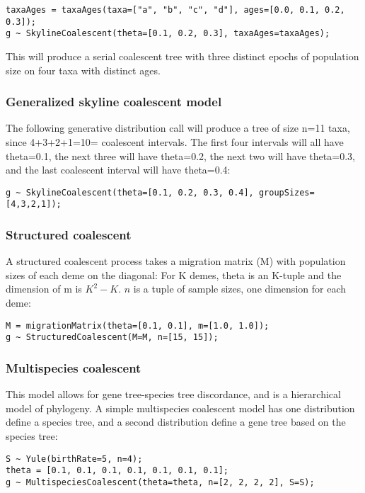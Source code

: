 \documentclass[11pt]{article}
\begin{document}
\begin{verbatim}
taxaAges = taxaAges(taxa=["a", "b", "c", "d"], ages=[0.0, 0.1, 0.2, 0.3]);
g ~ SkylineCoalescent(theta=[0.1, 0.2, 0.3], taxaAges=taxaAges);
\end{verbatim}

This will produce a serial coalescent tree with three distinct epochs of population size on four taxa with distinct ages.


\subsubsection{Generalized skyline coalescent model}

The following generative distribution call will produce a tree of size n=11 taxa, since 4+3+2+1=10= coalescent intervals.
The first four intervals will all have theta=0.1, the next three will have theta=0.2, the next two will have theta=0.3,
and the last coalescent interval will have theta=0.4:

\begin{verbatim}
g ~ SkylineCoalescent(theta=[0.1, 0.2, 0.3, 0.4], groupSizes=[4,3,2,1]);
\end{verbatim}

\subsubsection{Structured coalescent}

A structured coalescent process takes a migration matrix (M) with population sizes of each deme on the diagonal:
For K demes, theta is an K-tuple and the dimension of m is $K^2 - K$. $n$ is a tuple of sample sizes, one
dimension for each deme:

\begin{verbatim}
M = migrationMatrix(theta=[0.1, 0.1], m=[1.0, 1.0]);
g ~ StructuredCoalescent(M=M, n=[15, 15]);
\end{verbatim}

\subsubsection{Multispecies coalescent}

This model allows for gene tree-species tree discordance, and is a hierarchical model of phylogeny. A simple
multispecies coalescent model has one distribution define a species tree, and a second distribution define a gene tree
based on the species tree:

\begin{verbatim}
S ~ Yule(birthRate=5, n=4);
theta = [0.1, 0.1, 0.1, 0.1, 0.1, 0.1, 0.1];
g ~ MultispeciesCoalescent(theta=theta, n=[2, 2, 2, 2], S=S);
\end{verbatim}
\end{document}
